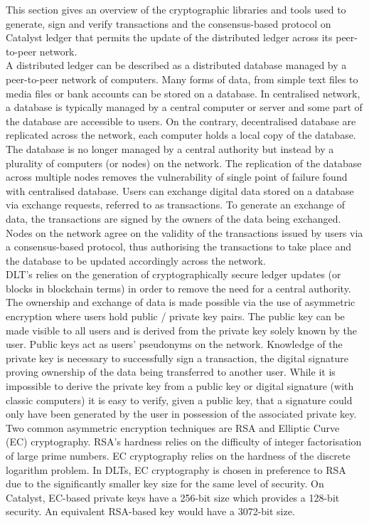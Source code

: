 This section gives an overview of the cryptographic libraries and tools used to generate, sign and verify transactions and the consensus-based protocol on Catalyst ledger that permits the update of the distributed ledger across its peer-to-peer network. \\

A distributed ledger can be described as a distributed database managed by a peer-to-peer network of computers. Many forms of data, from simple text files to media files or bank accounts can be stored on a database. In centralised network, a database is typically managed by a central computer or server and some part of the database are accessible to users. On the contrary, decentralised database are replicated across the network, each computer holds a local copy of the database. The database is no longer managed by a central authority but instead by a plurality of computers (or nodes) on the network. The replication of the database across multiple nodes removes the vulnerability of single point of failure found with centralised database. Users can exchange digital data stored on a database via exchange requests, referred to as transactions. To generate an exchange of data, the transactions are signed by the owners of the data being exchanged. Nodes on the network agree on the validity of the transactions issued by users via a consensus-based protocol, thus authorising the transactions to take place and the database to be updated accordingly across the network. \\

DLT's relies on the generation of cryptographically secure ledger updates (or blocks in blockchain terms) in order to remove the need for a central authority. The ownership and exchange of data is made possible via the use of asymmetric encryption where users hold public / private key pairs. The public key can be made visible to all users and is derived from the private key solely known by the user. Public keys act as users' pseudonyms on the network. Knowledge of the private key is necessary to successfully sign a transaction, the digital signature proving ownership of the data being transferred to another user. While it is impossible to derive the private key from a public key or digital signature (with classic computers) it is easy to verify, given a public key, that a signature could only have been generated by the user in possession of the associated private key. \\

Two common asymmetric encryption techniques are RSA and Elliptic Curve (EC) cryptography. RSA's hardness relies on the difficulty of integer factorisation of large prime numbers.  EC cryptography relies on the hardness of the discrete logarithm problem. In DLTs, EC cryptography is chosen in preference to RSA due to the significantly smaller key size for the same level of security. On Catalyst, EC-based private keys have a 256-bit size which provides a 128-bit security. An equivalent RSA-based key would have a 3072-bit size.

